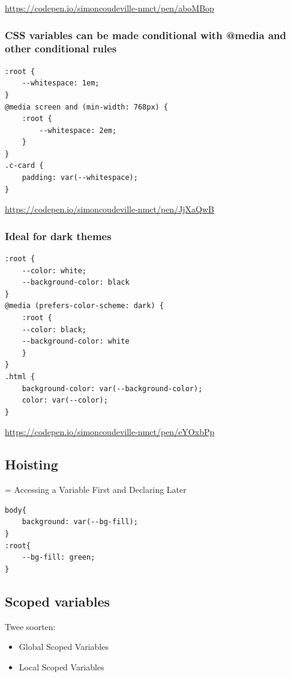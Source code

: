 \documentclass{article}
\begin{document}
\url{https://codepen.io/simoncoudeville-nmct/pen/aboMBop}

\subsubsection{CSS variables can be made conditional with @media and other conditional rules}

\begin{verbatim}
:root {
    --whitespace: 1em;
}
@media screen and (min-width: 768px) {
    :root {
        --whitespace: 2em;
    }
}
.c-card {
    padding: var(--whitespace);
}

\end{verbatim}


\url{https://codepen.io/simoncoudeville-nmct/pen/JjXaQwB}

\subsubsection{Ideal for dark themes}

\begin{verbatim}
:root {
    --color: white;
    --background-color: black
}
@media (prefers-color-scheme: dark) {
    :root {
    --color: black;
    --background-color: white
    }
}
.html {
    background-color: var(--background-color);
    color: var(--color);
}
\end{verbatim}

\url{https://codepen.io/simoncoudeville-nmct/pen/eYOxbPp}

\subsection{Hoisting}
= Accessing a Variable First and Declaring Later

\begin{verbatim}
body{
    background: var(--bg-fill);
}
:root{
    --bg-fill: green;
}

\end{verbatim}

\subsection{Scoped variables}

Twee soorten:
\begin{itemize}
    \item Global Scoped Variables
    \item Local Scoped Variables
\end{itemize}
\end{document}
